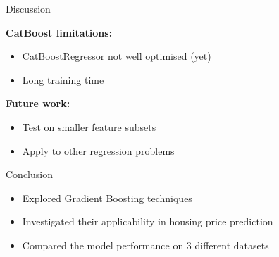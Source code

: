 \begin{frame}{Discussion}
	\begin{description}
		\item[\textbf{CatBoost limitations:}]
	\end{description}
	\begin{itemize}
		\item CatBoostRegressor not well optimised (yet)
		\item Long training time
	\end{itemize}
	
	\begin{description}
		\item[\textbf{Future work:}]
	\end{description}
	\begin{itemize}
		\item Test on smaller feature subsets
		\item Apply to other regression problems
	\end{itemize}
\end{frame}

\begin{frame}{Conclusion}
	\begin{itemize}
		\item Explored Gradient Boosting techniques
		\item Investigated their applicability in housing price prediction
		\item Compared the model performance on 3 different datasets
	\end{itemize}
\end{frame}
